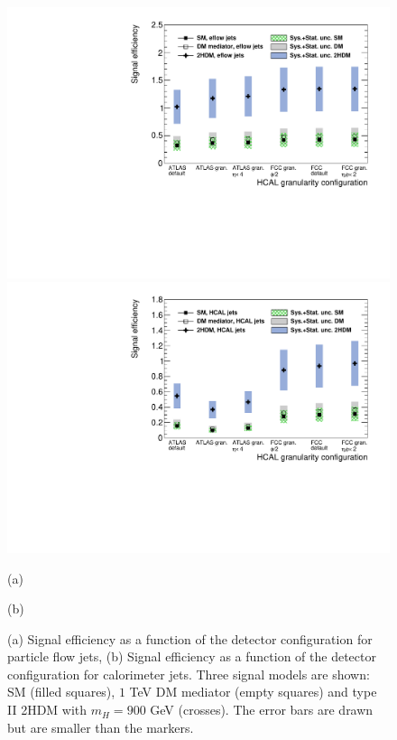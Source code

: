 \begin{figure}
	\centering
	\begin{minipage}{.5\textwidth}
		\centering
		\includegraphics[trim={.6cm 0 0 0},clip,width=\linewidth]{./Figures/EffvsGran_PFjets.pdf}
	\end{minipage}%
	\begin{minipage}{.5\textwidth}
		\centering
		\includegraphics[trim={0 0 .6cm 0},clip,width=\linewidth]{./Figures/EffvsGran_CALOjets.pdf}
	\end{minipage}
	\begin{minipage}[t]{0.5\textwidth}
		\caption*{(a)}
	\end{minipage}%
	\hfill
	\begin{minipage}[t]{0.5\textwidth}
		\caption*{(b)}
	\end{minipage}
	\caption{(a) Signal efficiency as a function of the detector configuration for particle flow jets, (b) Signal efficiency as a function of the detector configuration for calorimeter jets. Three signal models are shown: SM (filled squares), $1$ TeV DM mediator (empty squares) and type II 2HDM with $m_H=900$ GeV (crosses). The error bars are drawn but are smaller than the markers.}
	\label{fig:EffvsGran}
\end{figure}

